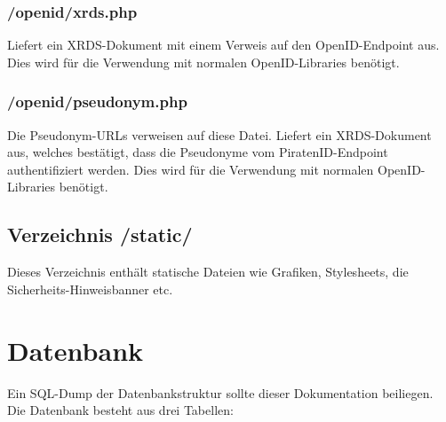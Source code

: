 \subsubsection{/openid/xrds.php}
Liefert ein XRDS-Dokument mit einem Verweis auf den OpenID-Endpoint aus.
Dies wird für die Verwendung mit normalen OpenID-Libraries benötigt.

\subsubsection{/openid/pseudonym.php}
Die Pseudonym-URLs verweisen auf diese Datei.
Liefert ein XRDS-Dokument aus, welches bestätigt, dass die Pseudonyme vom PiratenID-Endpoint authentifiziert werden.
Dies wird für die Verwendung mit normalen OpenID-Libraries benötigt.


\subsection{Verzeichnis /static/}
Dieses Verzeichnis enthält statische Dateien wie Grafiken, Stylesheets, die Sicherheits-Hinweisbanner etc.


\section{Datenbank}
Ein SQL-Dump der Datenbankstruktur sollte dieser Dokumentation beiliegen.
Die Datenbank besteht aus drei Tabellen:

